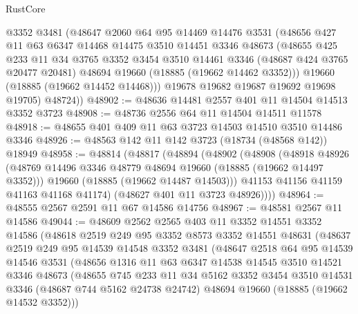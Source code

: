 \begin{lexlean}{RustCore}
\begin{coremodule}
        @3352
        @3481
        (@48647
          @2060
          @64
          @95
          @14469
          @14476
          @3531
          (@48656
            @427
            @11
            @63
            @6347
            @14468
            @14475
            @3510
            @14451
            @3346
            @48673
            (@48655
              @425
              @233
              @11
              @34
              @3765
              @3352
              @3454
              @3510
              @14461
              @3346
              (@48687 @424 @3765 @20477 @20481)
              @48694
              @19660
              (@18885 (@19662 @14462 @3352)))
            @19660
            (@18885 (@19662 @14452 @14468)))
          @19678
          @19682
          @19687
          @19692
          @19698
          @19705)
        @48724))
@48902 := @48636 @14481 @2557 @401 @11 @14504 @14513 @3352 @3723
@48908 := @48736 @2556 @64 @11 @14504 @14511 @11578
@48918 := @48655 @401 @409 @11 @63 @3723 @14503 @14510 @3510 @14486 @3346
@48926 := @48563 @142 @11 @142 @3723 (@18734 (@48568 @142)) @18949
@48958 := @48814
    (@48817
      (@48894
        (@48902
          (@48908
            (@48918
              @48926
              (@48769 @14496 @3346 @48779 @48694 @19660 (@18885 (@19662 @14497 @3352)))
              @19660
              (@18885 (@19662 @14487 @14503)))
            @41153
            @41156
            @41159
            @41163
            @41168
            @41174)
          (@48627 @401 @11 @3723 @48926))))
@48964 := @48555 @2567 @2591 @11 @67 @14586 @14756
@48967 := @48581 @2567 @11 @14586
@49044 := @48609
    @2562
    @2565
    @403
    @11
    @3352
    @14551
    @3352
    @14586
    (@48618
      @2519
      @249
      @95
      @3352
      @8573
      @3352
      @14551
      @48631
      (@48637
        @2519
        @249
        @95
        @14539
        @14548
        @3352
        @3481
        (@48647
          @2518
          @64
          @95
          @14539
          @14546
          @3531
          (@48656
            @1316
            @11
            @63
            @6347
            @14538
            @14545
            @3510
            @14521
            @3346
            @48673
            (@48655
              @745
              @233
              @11
              @34
              @5162
              @3352
              @3454
              @3510
              @14531
              @3346
              (@48687 @744 @5162 @24738 @24742)
              @48694
              @19660
              (@18885 (@19662 @14532 @3352)))

\end{coremodule}
\end{lexlean}
